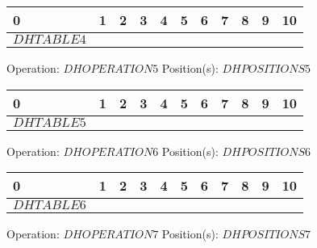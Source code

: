 \documentclass[12pt]{article}
\begin{document}
{{            \begin{center}
                \begin{tabular}{|P{0.75cm}|P{0.75cm}|P{0.75cm}|P{0.75cm}|P{0.75cm}|P{0.75cm}|P{0.75cm}|P{0.75cm}|P{0.75cm}|P{0.75cm}|P{0.75cm}|}
                     & 1 & 2 & 3 & 4 & 5 & 6 & 7 & 8 & 9 & 10  \\
                    \hline
                    $DHTABLE4$&&&&&&&&&& \\
                    \hline
                \end{tabular}
            \end{center}Operation: \underline{$DHOPERATION5$} \hspace{10px} Position(s): \underline{$DHPOSITIONS5$}
            \begin{center}
                \begin{tabular}{|P{0.75cm}|P{0.75cm}|P{0.75cm}|P{0.75cm}|P{0.75cm}|P{0.75cm}|P{0.75cm}|P{0.75cm}|P{0.75cm}|P{0.75cm}|P{0.75cm}|}
                     & 1 & 2 & 3 & 4 & 5 & 6 & 7 & 8 & 9 & 10  \\
                    \hline
                    $DHTABLE5$&&&&&&&&&& \\
                    \hline
                \end{tabular}
            \end{center}Operation: \underline{$DHOPERATION6$} \hspace{10px} Position(s): \underline{$DHPOSITIONS6$}
            \begin{center}
                \begin{tabular}{|P{0.75cm}|P{0.75cm}|P{0.75cm}|P{0.75cm}|P{0.75cm}|P{0.75cm}|P{0.75cm}|P{0.75cm}|P{0.75cm}|P{0.75cm}|P{0.75cm}|}
                     & 1 & 2 & 3 & 4 & 5 & 6 & 7 & 8 & 9 & 10  \\
                    \hline
                    $DHTABLE6$&&&&&&&&&& \\
                    \hline
                \end{tabular}
            \end{center}Operation: \underline{$DHOPERATION7$} \hspace{10px} Position(s): \underline{$DHPOSITIONS7$}
            \begin{center}
                \begin{tabular}{|P{0.75cm}|P{0.75cm}|P{0.75cm}|P{0.75cm}|P{0.75cm}|P{0.75cm}|P{0.75cm}|P{0.75cm}|P{0.75cm}|P{0.75cm}|P{0.75cm}|}

\end{tabular}
\end{center}}}
\end{document}
